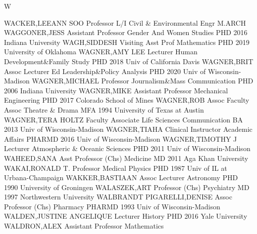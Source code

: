 \documentclass[
]{article}
\begin{document}
W

\textbar{}  \textbar{}

WACKER,LEEANN SOO \textbar Professor L/I \textbar Civil \& Environmental
Engr \textbar M.ARCH \textbar{}  \textbar WAGGONER,JESS
\textbar Assistant Professor \textbar Gender And Women Studies
\textbar PHD 2016 Indiana University \textbar{} 
\textbar WAGH,SIDDESH \textbar Visiting Asst Prof \textbar Mathematics
\textbar PHD 2019 University of Oklahoma \textbar{} 
\textbar WAGNER,AMY LEE \textbar Lecturer \textbar Human
Development\&Family Study \textbar PHD 2018 Univ of California Davis
\textbar{}  \textbar WAGNER,BRIT \textbar Assoc Lecturer
\textbar Ed Leadership\&Policy Analysis \textbar PHD 2020 Univ of
Wisconsin-Madison \textbar{}  \textbar WAGNER,MICHAEL
\textbar Professor \textbar Journalism\&Mass Communication \textbar PHD
2006 Indiana University \textbar{}  \textbar WAGNER,MIKE
\textbar Assistant Professor \textbar Mechanical Engineering
\textbar PHD 2017 Colorado School of Mines \textbar{} 
\textbar WAGNER,ROB \textbar Assoc Faculty Assoc \textbar Theatre \&
Drama \textbar MFA 1994 University of Texas at Austin \textbar{}
 \textbar WAGNER,TERA HOLTZ \textbar Faculty Associate
\textbar Life Sciences Communication \textbar BA 2013 Univ of
Wisconsin-Madison \textbar{}  \textbar WAGNER,TIAHA
\textbar Clinical Instructor \textbar Academic Affairs \textbar PHARMD
2016 Univ of Wisconsin-Madison \textbar{} 
\textbar WAGNER,TIMOTHY J \textbar Lecturer \textbar Atmospheric \&
Oceanic Sciences \textbar PHD 2011 Univ of Wisconsin-Madison \textbar{}
 \textbar WAHEED,SANA \textbar Asst Professor (Chs)
\textbar Medicine \textbar MD 2011 Aga Khan University \textbar{}
 \textbar WAKAI,RONALD T. \textbar Professor
\textbar Medical Physics \textbar PHD 1987 Univ of IL at
Urbana-Champaign \textbar{}  \textbar WAKKER,BASTIAAN
\textbar Assoc Lecturer \textbar Astronomy \textbar PHD 1990 University
of Groningen \textbar{}  \textbar WALASZEK,ART
\textbar Professor (Chs) \textbar Psychiatry \textbar MD 1997
Northwestern University \textbar{}  \textbar WALBRANDT
PIGARELLI,DENISE \textbar Assoc Professor (Chs) \textbar Pharmacy
\textbar PHARMD 1993 Univ of Wisconsin-Madison \textbar{} 
\textbar WALDEN,JUSTINE ANGELIQUE \textbar Lecturer \textbar History
\textbar PHD 2016 Yale University \textbar{} 
\textbar WALDRON,ALEX \textbar Assistant Professor \textbar Mathematics
\end{document}
